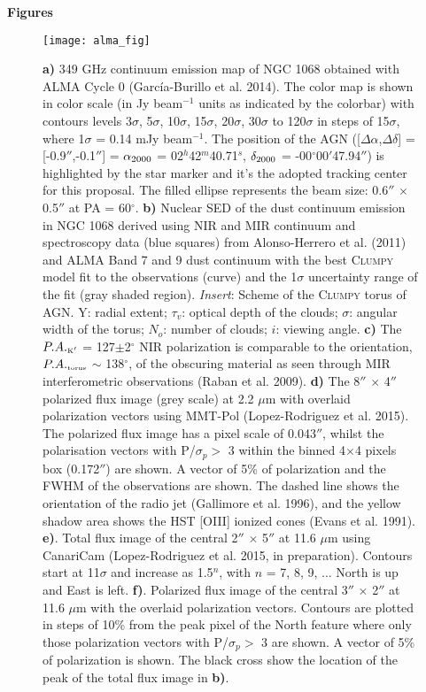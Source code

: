 \documentclass[12pt,a4paper]{article}  %
\begin{document}
\textbf{Figures}

\begin{figure}[tbh]
\centering
\texttt{[image: alma\_fig]}
\caption{\textbf{a)} 349 GHz continuum emission map of NGC 1068 obtained with ALMA Cycle 0 (Garc\'ia-Burillo et al. 2014). The color map is shown in color scale (in Jy beam$^{-1}$ units as indicated by the colorbar) with contours levels 3$\sigma$, 5$\sigma$, 10$\sigma$, 15$\sigma$, 20$\sigma$, 30$\sigma$ to 120$\sigma$ in steps of 15$\sigma$, where 1$\sigma$ = 0.14 mJy beam$^{-1}$. The position of the AGN ([$\Delta\alpha$,$\Delta\delta$] = [-0.9$''$,-0.1$''$] = $\alpha_{\tiny 2000}$ = 02$^{h}$42$^{m}$40.71$^{s}$, $\delta_{\tiny 2000}$ = -00$^{\circ}$00$'$47.94$''$) is highlighted by the star marker and it's the adopted tracking center for this proposal. The filled ellipse represents the beam size: 0.6$''$ $\times$ 0.5$''$ at PA = 60$^{\circ}$. 
\textbf{b)} Nuclear SED of the dust continuum emission in NGC 1068 derived using NIR and MIR continuum and spectroscopy data (blue squares) from Alonso-Herrero et al. (2011) and ALMA Band 7 and 9 dust continuum with the best \textsc{Clumpy} model fit to the observations (curve) and the 1$\sigma$ uncertainty range of the fit (gray shaded region). \textit{Insert}: Scheme of the \textsc{Clumpy} torus of AGN. Y: radial extent; $\tau_{v}$: optical depth of the clouds; $\sigma$: angular width of the torus;  $N_{o}$: number of clouds; $i$: viewing angle. 
\textbf{c)} The $P.A._{\mbox{\tiny K$'$}}$ = 127$\pm$2$^{\circ}$ NIR polarization is comparable to the orientation, $P.A._{\mbox{\tiny torus}}$ $\sim$ 138$^{\circ}$, of the obscuring material as seen through MIR interferometric observations (Raban et al. 2009). 
\textbf{d)} The 8$''$ $\times$ 4$''$ polarized flux image (grey scale) at 2.2 $\mu$m with overlaid polarization vectors using MMT-Pol (Lopez-Rodriguez et al. 2015). The polarized flux image has a pixel scale of 0.043$''$, whilst the polarisation vectors with P/$\sigma_{p} >$  3 within the binned 4$\times$4 pixels box (0.172$''$) are shown. A vector of 5\% of polarization and the FWHM of the observations are shown. The dashed line shows the orientation of the radio jet (Gallimore et al. 1996), and the yellow shadow area shows the HST [OIII] ionized cones (Evans et al. 1991). 
\textbf{e)}. Total flux image of the central 2$''$ $\times$ 5$''$ at 11.6 $\mu$m using CanariCam (Lopez-Rodriguez et al. 2015, in preparation). Contours start at 11$\sigma$ and increase as 1.5$^{n}$, with $n$ = 7, 8, 9, ... North is up and East is left.
\textbf{f)}. Polarized flux image of the central 3$''$ $\times$ 2$''$ at 11.6 $\mu$m with the overlaid polarization vectors. Contours are plotted in steps of 10\% from the peak pixel of the North feature where only those polarization vectors with P/$\sigma_{p} >$  3 are shown. A vector of 5\% of polarization is shown. The black cross show the location of the peak of the total flux image in \textbf{b)}.}
\end{figure}




\end{document}
